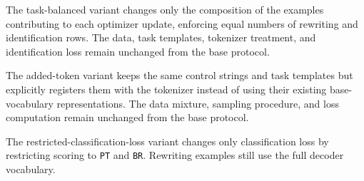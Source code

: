 The task-balanced variant changes only the composition of the examples
contributing to each optimizer update, enforcing equal numbers of rewriting
and identification rows. The data, task templates, tokenizer treatment, and
identification loss remain unchanged from the base protocol.

The added-token variant keeps the same control strings and task templates but
explicitly registers them with the
tokenizer instead of using their existing base-vocabulary representations.
The data mixture, sampling procedure, and loss computation remain unchanged
from the base protocol.

The restricted-classification-loss variant changes only classification loss by
restricting scoring to \texttt{PT} and \texttt{BR}. Rewriting examples still
use the full decoder vocabulary.
